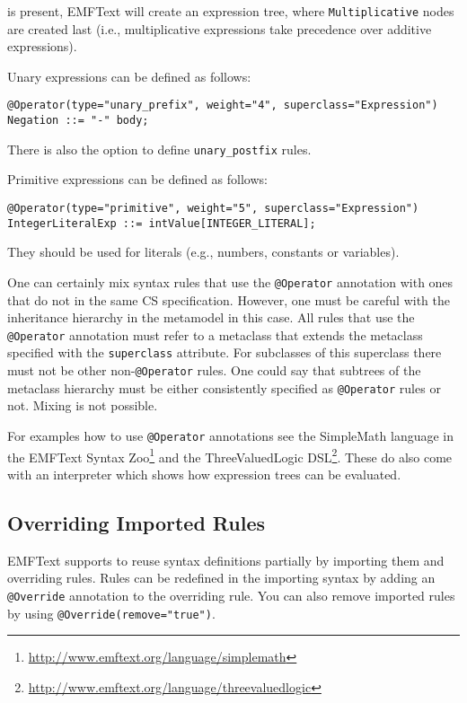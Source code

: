 is present, EMFText will create an expression tree, where
\texttt{Multiplicative} nodes are created last (i.e., multiplicative expressions 
take precedence over additive expressions).

Unary expressions can be defined as follows:

\lstset{language=CS}
\begin{lstlisting}
@Operator(type="unary_prefix", weight="4", superclass="Expression")	
Negation ::= "-" body;
\end{lstlisting}

There is also the option to define \texttt{unary\_postfix} rules.

Primitive expressions can be defined as follows:

\lstset{language=CS}
\begin{lstlisting}
@Operator(type="primitive", weight="5", superclass="Expression")
IntegerLiteralExp ::= intValue[INTEGER_LITERAL];
\end{lstlisting}

They should be used for literals (e.g., numbers, constants or variables).

One can certainly mix syntax rules that use the \texttt{@Operator} annotation
with ones that do not in the same CS specification. However, one must be careful
with the inheritance hierarchy in the metamodel in this case. All rules that
use the \texttt{@Operator} annotation must refer to a metaclass that extends the
metaclass specified with the \texttt{superclass} attribute. For subclasses of
this superclass there must not be other non-\texttt{@Operator} rules. One could
say that subtrees of the metaclass hierarchy must be either consistently
specified as \texttt{@Operator} rules or not. Mixing is not possible.

For examples how to use \texttt{@Operator} annotations see the SimpleMath
language in the EMFText Syntax
Zoo\footnote{\url{http://www.emftext.org/language/simplemath}} and the
ThreeValuedLogic
DSL\footnote{\url{http://www.emftext.org/language/threevaluedlogic}}. These do
also come with an interpreter which shows how expression trees can be evaluated.

\subsection{Overriding Imported Rules}

EMFText supports to reuse syntax definitions partially by importing them and
overriding rules. Rules can be redefined in the importing
syntax by adding an \texttt{@Override} annotation to the overriding
rule. You can also remove imported rules by using
\texttt{@Override(remove="true")}.

